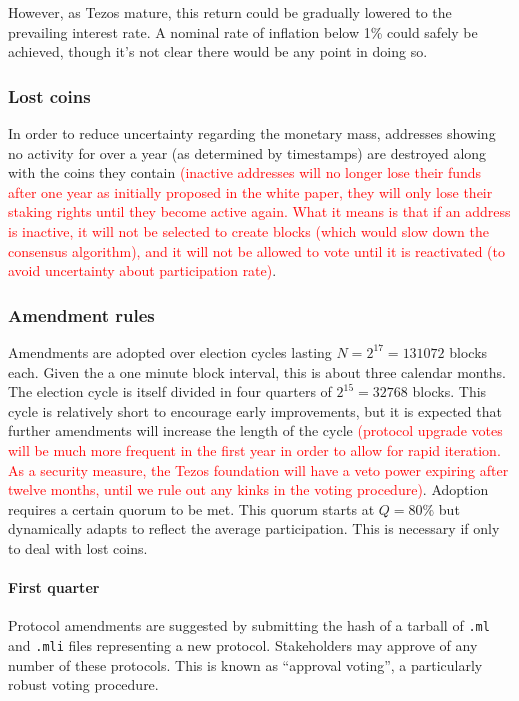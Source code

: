 \documentclass[letterpaper]{article}
\newcommand\change[1]{\textcolor{red}{#1}}
\begin{document}
However, as Tezos mature, this return could be gradually lowered to the
prevailing interest rate. A nominal rate of inflation below 1\% could safely be
achieved, though it's not clear there would be any point in doing so.

\subsubsection{Lost coins}
In order to reduce uncertainty regarding the monetary mass, addresses
showing no activity for over a year (as determined by timestamps)
are destroyed along with the coins they contain \change {(inactive addresses will no longer lose their funds after one year as initially proposed in the white paper, they will only lose their staking rights until they become active again. What it means is that if an address is inactive, it will not be selected to create blocks (which would slow down the consensus algorithm), and it will not be allowed to vote until it is reactivated (to avoid uncertainty about participation rate)}.

\subsubsection{Amendment rules}
Amendments are adopted over election cycles lasting $N = 2^{17} = \num{131072}$
blocks each. Given the  a one minute block interval, this is about three
calendar months. The election cycle is itself divided in four quarters of
$2^{15} = \num{32768}$ blocks. This cycle is relatively short to encourage early
improvements, but it is expected that further amendments will increase the
length of the cycle \change {(protocol upgrade votes will be much more frequent in the first year in order to allow for rapid iteration. As a security measure, the Tezos foundation will have a veto power expiring after twelve months, until we rule out any kinks in the voting procedure)}. Adoption requires a certain quorum to be met. This quorum
starts at $Q = 80\%$ but dynamically adapts to reflect the average
participation. This is necessary if only to deal with lost coins.
 
\paragraph{First quarter}
Protocol amendments are suggested by submitting the hash of a tarball of
\verb!.ml! and \verb!.mli! files representing a new protocol. Stakeholders may
approve of any number of these protocols. This is known as ``approval voting'',
a particularly robust voting procedure.
\end{document}
